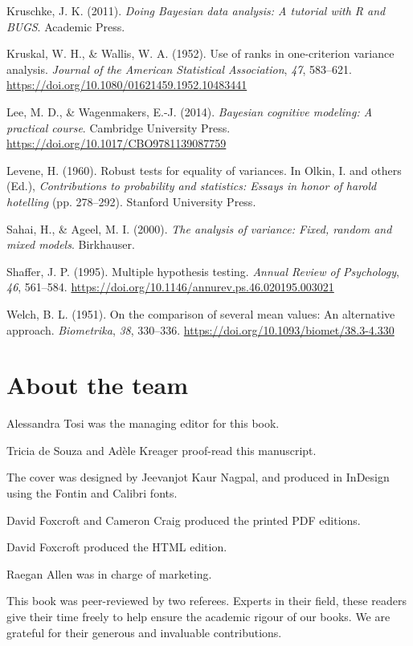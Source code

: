 \documentclass[
  a4paper,
]{book}
\newlength{\cslhangindent}
\newlength{\cslentryspacingunit} %
\newenvironment{CSLReferences}[2] %
 {%
  \setlength{\parindent}{0pt}
  \ifodd #1
  \let\oldpar\par
  \def\par{\hangindent=\cslhangindent\oldpar}
  \fi
  \setlength{\parskip}{#2\cslentryspacingunit}
 }%
 {}
\begin{document}
\begin{CSLReferences}{1}{0}
\leavevmode{}%
Kruschke, J. K. (2011). \emph{Doing {B}ayesian data analysis: A tutorial
with {R} and {BUGS}}. Academic Press.

\leavevmode{}%
Kruskal, W. H., \& Wallis, W. A. (1952). Use of ranks in one-criterion
variance analysis. \emph{Journal of the American Statistical
Association}, \emph{47}, 583--621.
\url{https://doi.org/10.1080/01621459.1952.10483441}

\leavevmode{}%
Lee, M. D., \& Wagenmakers, E.-J. (2014). \emph{Bayesian cognitive
modeling: A practical course}. Cambridge University Press.
\url{https://doi.org/10.1017/CBO9781139087759}

\leavevmode{}%
Levene, H. (1960). Robust tests for equality of variances. In Olkin, I.
and others (Ed.), \emph{Contributions to probability and statistics:
Essays in honor of harold hotelling} (pp. 278--292). Stanford University
Press.

\leavevmode{}%
Sahai, H., \& Ageel, M. I. (2000). \emph{The analysis of variance:
Fixed, random and mixed models}. Birkhauser.

\leavevmode{}%
Shaffer, J. P. (1995). Multiple hypothesis testing. \emph{Annual Review
of Psychology}, \emph{46}, 561--584.
\url{https://doi.org/10.1146/annurev.ps.46.020195.003021}

\leavevmode{}%
Welch, B. L. (1951). On the comparison of several mean values: An
alternative approach. \emph{Biometrika}, \emph{38}, 330--336.
\url{https://doi.org/10.1093/biomet/38.3-4.330}

\end{CSLReferences}


\backmatter

\printendnotes
\newpage

\chapter{About the team}

Alessandra Tosi was the managing editor for this book.

Tricia de Souza and Adèle Kreager proof-read this manuscript.

The cover was designed by Jeevanjot Kaur Nagpal, and produced in InDesign using the Fontin and Calibri fonts.

David Foxcroft and Cameron Craig produced the printed PDF editions. 

David Foxcroft produced the HTML edition.

Raegan Allen was in charge of marketing.

This book was peer-reviewed by two referees. Experts in their field, these readers give their time freely to help ensure the academic rigour of our books. We are grateful for their generous and invaluable contributions.

\newpage


%
\end{document}
